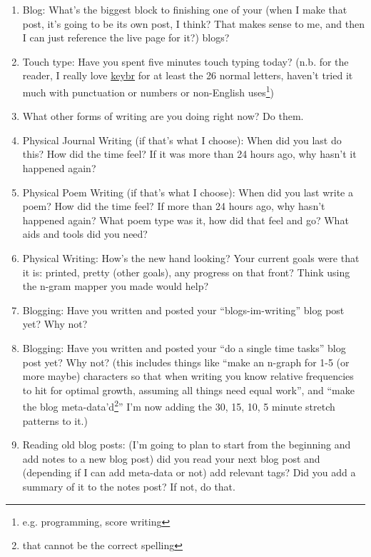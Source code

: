 \documentclass[12pt]{article}
\newcommand{\say}[1]{``#1''}
\renewcommand{\,}{\textsuperscript{,}}
\begin{document}
\begin{enumerate}
\item Blog: What's the biggest block to finishing one of your  (when I make that post, it's going to be its own post, I think? That makes sense to me, and then I can just reference the live page for it?) blogs?

\item Touch type: Have you spent five minutes touch typing today? (n.b. for the reader, I really love \href{keybr.com}{keybr} for at least the 26 normal letters, haven't tried it much with punctuation or numbers or non-English uses\footnote{e.g. programming, score writing})

\item What other forms of writing are you doing right now? Do them.

\item Physical Journal Writing (if that's what I choose): When did you last do this? How did the time feel? If it was more than 24 hours ago, why hasn't it happened again?

\item Physical Poem Writing (if that's what I choose): When did you last write a poem? How did the time feel? If more than 24 hours ago, why hasn't happened again? What poem type was it, how did that feel and go? What aids and tools did you need?

\item Physical Writing: How's the new hand looking? Your current goals were that it is: printed, pretty (other goals), any progress on that front? Think using the n-gram mapper you made would help?

\item Blogging: Have you written and posted your \say{blogs-im-writing} blog post yet? Why not?

\item Blogging: Have you written and posted your \say{do a single time tasks} blog post yet? Why not? (this includes things like \say{make an n-graph for 1-5 (or more maybe) characters so that when writing you know relative frequencies to hit for optimal growth, assuming all things need equal work}, and \say{make the blog meta-data'd\footnote{that cannot be the correct spelling}} I'm now adding the 30, 15, 10, 5 minute stretch patterns to it.)

\item Reading old blog posts: (I'm going to plan to start from the beginning and add notes to a new blog post) did you read your next blog post and (depending if I can add meta-data or not) add relevant tags? Did you add a summary of it to the notes post? If not, do that.


\end{enumerate}
\end{document}
